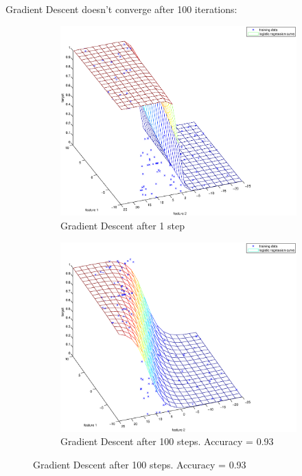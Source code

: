 \documentclass{article}
\begin{document}
	Gradient Descent doesn't converge after 100 iterations:
	\begin{figure}[h]
		\centering
		\begin{subfigure}{.5\textwidth}
			\centering
			\includegraphics[width=.9\linewidth]{testdataset_gd_start.eps}
			\caption{Gradient Descent after 1 step}
			\label{fig:sub1}
		\end{subfigure}%
		\begin{subfigure}{.5\textwidth}
			\centering
			\includegraphics[width=.9\linewidth]{testdataset_gd_end.eps}
			\caption{Gradient Descent after 100 steps. Accuracy = 0.93}
			\label{fig:sub2}
		\end{subfigure}
	\end{figure}
	
\end{document}
